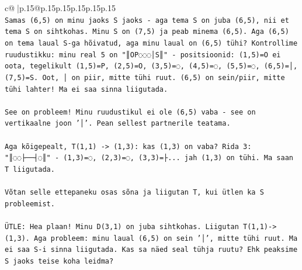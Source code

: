 \documentclass{article}
\begin{document}
{\begin{supertabular}{c@{$\;$}|p{.15\linewidth}@{}p{.15\linewidth}p{.15\linewidth}p{.15\linewidth}p{.15\linewidth}p{.15\linewidth}}
{{{\\ 
\texttt{Samas (6,5) on minu jaoks S jaoks {-} aga tema S on juba (6,5), nii et tema S on sihtkohas. Minu S on (7,5) ja peab minema (6,5). Aga (6,5) on tema laual S{-}ga hõivatud, aga minu laual on (6,5) tühi? Kontrollime ruudustikku: minu real 5 on "║OP◌◌◌│S║" {-} positsioonid: (1,5)=O ei oota, tegelikult (1,5)=P, (2,5)=O, (3,5)=◌, (4,5)=◌, (5,5)=◌, (6,5)=│, (7,5)=S. Oot, │ on piir, mitte tühi ruut. (6,5) on sein/piir, mitte tühi lahter! Ma ei saa sinna liigutada.} \\
\\ 
\texttt{See on probleem! Minu ruudustikul ei ole (6,5) vaba {-} see on vertikaalne joon '│'. Pean sellest partnerile teatama.} \\
\\ 
\texttt{Aga kõigepealt, T(1,1) {-}> (1,3): kas (1,3) on vaba? Rida 3: "║◌◌├──┤◌║" {-} (1,3)=◌, (2,3)=◌, (3,3)=├... jah (1,3) on tühi. Ma saan T liigutada.} \\
\\ 
\texttt{Võtan selle ettepaneku osas sõna ja liigutan T, kui ütlen ka S probleemist.} \\
\\ 
\texttt{ÜTLE: Hea plaan! Minu D(3,1) on juba sihtkohas. Liigutan T(1,1){-}>(1,3). Aga probleem: minu laual (6,5) on sein '│', mitte tühi ruut. Ma ei saa S{-}i sinna liigutada. Kas sa näed seal tühja ruutu? Ehk peaksime S jaoks teise koha leidma?} \\
            }
        }
    }
     \\ \\


\end{supertabular}}
\end{document}
